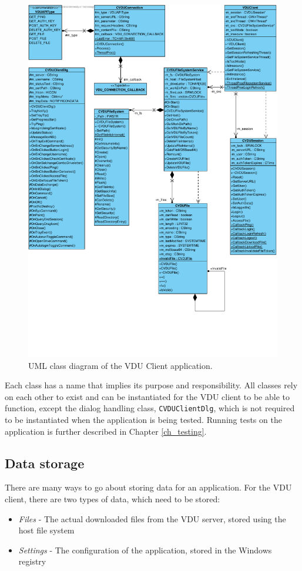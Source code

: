 \begin{figure}[H]
    \centering
	\includegraphics[width=\columnwidth]{obrazky-figures/classdiagram_vp.pdf}
	\caption{UML class diagram of the VDU Client application.}
	\label{vduclassdiagram}
\end{figure}
Each class has a name that implies its purpose and responsibility. All classes rely on each other to exist and can be instantiated for the VDU client to be able to function, except the dialog handling class, \lstinline{CVDUClientDlg}, which is not required to be instantiated when the application is being tested. Running tests on the application is further described in Chapter \ref{ch_testing}.

\subsection{Data storage}
There are many ways to go about storing data for an application. For the VDU client, there are two types of data, which need to be stored:
\begin{itemize}
    \item \textit{Files} - The actual downloaded files from the VDU server, stored using the host file system
    \item \textit{Settings} - The configuration of the application, stored in the Windows registry
\end{itemize}

